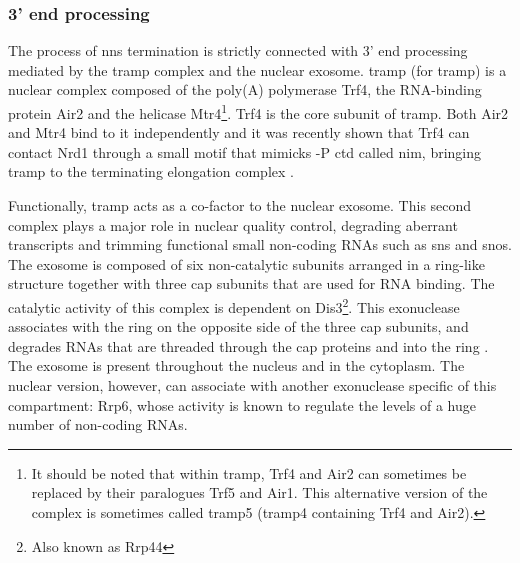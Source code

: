\subsubsection{3' end processing}

The process of \gls{nns} termination is strictly connected with 3' end processing mediated by the \gls{tramp} complex and the nuclear exosome.
\gls{tramp} (for \glsdesc{tramp}) is a nuclear complex composed of the poly(A) polymerase Trf4, the RNA-binding protein Air2 and the helicase Mtr4\footnote{It should be noted that within \gls{tramp}, Trf4 and Air2 can sometimes be replaced by their paralogues Trf5 and Air1. This alternative version of the complex is sometimes called \gls{tramp}5 (\gls{tramp}4 containing Trf4 and Air2).}.
Trf4 is the core subunit of \gls{tramp}.
Both Air2 and Mtr4 bind to it independently and it was recently shown that Trf4 can contact Nrd1 through a small motif that mimicks \serf{}-P \gls{ctd} called \gls{nim}, bringing \gls{tramp} to the terminating elongation complex \cite{tudek:2014:molecular}.

Functionally, \gls{tramp} acts as a co-factor to the nuclear exosome.
This second complex plays a major role in nuclear quality control, degrading aberrant transcripts and trimming functional small non-coding RNAs such as \gls{sns} and \gls{snos}.
The exosome is composed of six non-catalytic subunits arranged in a ring-like structure together with three cap subunits that are used for RNA binding.
The catalytic activity of this complex is dependent on Dis3\footnote{Also known as Rrp44}.
This \TtoF{} exonuclease associates with the ring on the opposite side of the three cap subunits, and degrades RNAs that are threaded through the cap proteins and into the ring \cite{makino:2015:rna}.
The exosome is present throughout the nucleus and in the cytoplasm.
The nuclear version, however, can associate with another exonuclease specific of this compartment: Rrp6, whose activity is known to regulate the levels of a huge number of non-coding RNAs.

